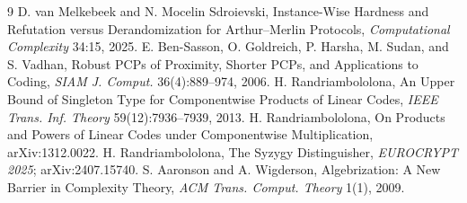 \documentclass[11pt]{article}
\begin{document}
\begin{thebibliography}{9}
 D. van Melkebeek and N. Mocelin Sdroievski, Instance-Wise Hardness and Refutation versus Derandomization for Arthur--Merlin Protocols, \emph{Computational Complexity} 34:15, 2025.
 E. Ben-Sasson, O. Goldreich, P. Harsha, M. Sudan, and S. Vadhan, Robust PCPs of Proximity, Shorter PCPs, and Applications to Coding, \emph{SIAM J. Comput.} 36(4):889--974, 2006.
 H. Randriambololona, An Upper Bound of Singleton Type for Componentwise Products of Linear Codes, \emph{IEEE Trans. Inf. Theory} 59(12):7936--7939, 2013.
 H. Randriambololona, On Products and Powers of Linear Codes under Componentwise Multiplication, arXiv:1312.0022.
 H. Randriambololona, The Syzygy Distinguisher, \emph{EUROCRYPT 2025}; arXiv:2407.15740.
 S. Aaronson and A. Wigderson, Algebrization: A New Barrier in Complexity Theory, \emph{ACM Trans. Comput. Theory} 1(1), 2009.
\end{thebibliography}
\end{document}
